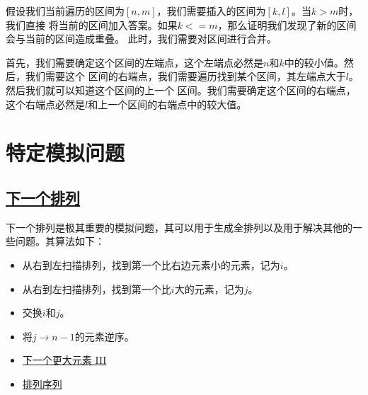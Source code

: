 \documentclass[../../main.tex]{subfiles}
\begin{document}
假设我们当前遍历的区间为$[n, m]$，我们需要插入的区间为$[k, l]$。当$k > m$时，我们直接
将当前的区间加入答案。如果$k <= m$，那么证明我们发现了新的区间会与当前的区间造成重叠。
此时，我们需要对区间进行合并。

首先，我们需要确定这个区间的左端点，这个左端点必然是$n$和$k$中的较小值。然后，我们需要这个
区间的右端点，我们需要遍历找到某个区间，其左端点大于$l$。然后我们就可以知道这个区间的上一个
区间。我们需要确定这个区间的右端点，这个右端点必然是$l$和上一个区间的右端点中的较大值。




\section{特定模拟问题}

\subsection{\href{https://leetcode.cn/problems/next-permutation/}{下一个排列}}

下一个排列是极其重要的模拟问题，其可以用于生成全排列以及用于解决其他的一些问题。其算法如下：

\begin{itemize}
  \item 从右到左扫描排列，找到第一个比右边元素小的元素，记为$i$。
  \item 从右到左扫描排列，找到第一个比$i$大的元素，记为$j$。
  \item 交换$i$和$j$。
  \item 将$j \to n - 1$的元素逆序。
\end{itemize}



\begin{kaobox}[title=类似题目]
  \begin{itemize}
    \item \href{https://leetcode-cn.com/problems/next-greater-element-iii/}{下一个更大元素 III}
    \item \href{https://leetcode.cn/problems/permutation-sequence/}{排列序列}
  \end{itemize}
\end{kaobox}
\end{document}
